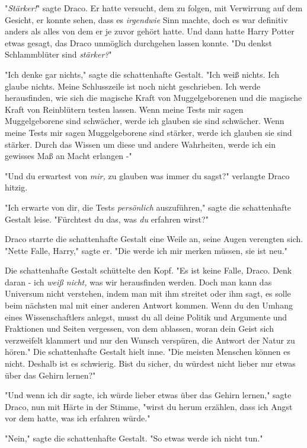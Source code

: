 {"\emph{Stärker!}" sagte Draco. Er hatte versucht, dem zu folgen, mit Verwirrung auf dem Gesicht, er konnte sehen, dass es \emph{irgendwie} Sinn machte, doch es war definitiv anders als alles von dem er je zuvor gehört hatte. Und dann hatte Harry Potter etwas gesagt, das Draco unmöglich durchgehen lassen konnte. "Du denkst Schlammblüter sind \emph{stärker?}"

"Ich denke gar nichts," sagte die schattenhafte Gestalt. "Ich weiß nichts. Ich glaube nichts. Meine Schlusszeile ist noch nicht geschrieben. Ich werde herausfinden, wie sich die magische Kraft von Muggelgeborenen und die magische Kraft von Reinblütern testen lassen. Wenn meine Tests mir sagen Muggelgeborene sind schwächer, werde ich glauben sie sind schwächer. Wenn meine Tests mir sagen Muggelgeborene sind stärker, werde ich glauben sie sind stärker. Durch das Wissen um diese und andere Wahrheiten, werde ich ein gewisses Maß an Macht erlangen -"

"Und du erwartest von \emph{mir,} zu glauben was immer du sagst?" verlangte Draco hitzig.

"Ich erwarte von dir, die Tests \emph{persönlich} auszuführen," sagte die schattenhafte Gestalt leise. "Fürchtest du das, was \emph{du} erfahren wirst?"

Draco starrte die schattenhafte Gestalt eine Weile an, seine Augen verengten sich. "Nette Falle, Harry," sagte er. "Die werde ich mir merken müssen, sie ist neu."

Die schattenhafte Gestalt schüttelte den Kopf. "Es ist keine Falle, Draco. Denk daran - ich \emph{weiß nicht,} was wir herausfinden werden. Doch man kann das Universum nicht verstehen, indem man mit ihm streitet oder ihm sagt, es solle beim nächsten mal mit einer anderen Antwort kommen. Wenn du den Umhang eines Wissenschaftlers anlegst, musst du all deine Politik und Argumente und Fraktionen und Seiten vergessen, von dem ablassen, woran dein Geist sich verzweifelt klammert und nur den Wunsch verspüren, die Antwort der Natur zu hören." Die schattenhafte Gestalt hielt inne. "Die meisten Menschen können es nicht. Deshalb ist es schwierig. Bist du sicher, du würdest nicht lieber nur etwas über das Gehirn lernen?"

"Und wenn ich dir sagte, ich würde lieber etwas über das Gehirn lernen," sagte Draco, nun mit Härte in der Stimme, "wirst du herum erzählen, dass ich Angst vor dem hatte, was ich erfahren würde."

"Nein," sagte die schattenhafte Gestalt. "So etwas werde ich nicht tun."

}
